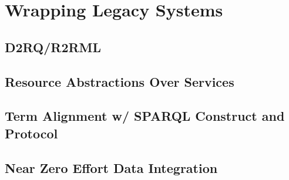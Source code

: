 \chapter{Wrapping Legacy Systems}

\section{D2RQ/R2RML}

\section{Resource Abstractions Over Services}

\section{Term Alignment w/ SPARQL Construct and Protocol}

\section{Near Zero Effort Data Integration}
